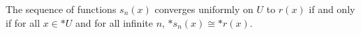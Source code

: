 The sequence of functions $s_n(x)$ converges uniformly on $U$ to $r(x)$ if and only if for all $x \in *U$ and for all infinite $n$, $*s_n(x) \cong *r(x)$.

